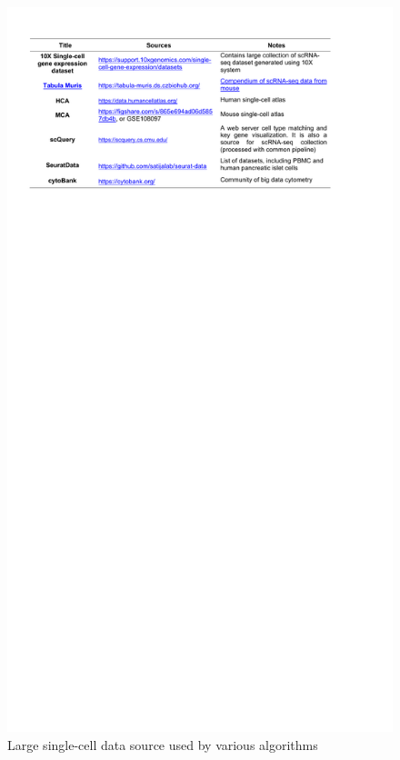 \documentclass[
]{book}
\begin{document}
\begin{figure}

{\centering \includegraphics[width=19.39in]{Table/Table2e} 

}

\caption{Large single-cell data source used by various algorithms}\label{fig:Table2e}
\end{figure}
\end{document}
